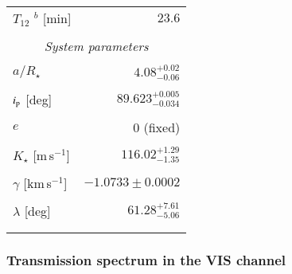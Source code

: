 \documentclass{aa}
\begin{document}
\begin{table}[]
\begin{tabular}{lr}
  \\[-1em]
 \quad $T_{12}$ $^b$ [min] & $23.6$\\
 \\[-1em]
 \multicolumn{2}{c}{\it System parameters}\\\noalign{\smallskip}
   \\[-1em]
  \quad $a/R_{\star}$& $4.08^{+0.02}_{-0.06}$ \\
 \\[-1em]
 \quad $i_{\rm p}$ [deg]& $89.623^{+0.005}_{-0.034}$\\
 \\[-1em]
 \quad $e$& 0 (fixed)\\
\\[-1em]
\quad $K_{\star}$ [m\,s$^{-1}$]& $116.02^{+1.29}_{-1.35}$\\
  \\[-1em]
\quad $\gamma$ [km\,s$^{-1}$]& $-1.0733\pm0.0002$\\
  \\[-1em]
 \quad $\lambda$ [deg]& $61.28^{+7.61}_{-5.06}$\\
\\[-1em]
\lasthline
\end{tabular}
\label{tab:params}
\end{table}


\subsubsection{Transmission spectrum in the VIS channel} \label{subsec:vis}
\end{document}
